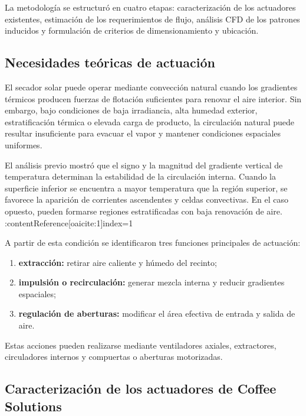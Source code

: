 La metodología se estructuró en cuatro etapas: caracterización de los actuadores existentes, estimación de los requerimientos de flujo, análisis CFD de los patrones inducidos y formulación de criterios de dimensionamiento y ubicación.

\subsection{Necesidades teóricas de actuación}
\label{subsec:necesidades_teoricas_actuacion}

El secador solar puede operar mediante convección natural cuando los gradientes térmicos producen fuerzas de flotación suficientes para renovar el aire interior. Sin embargo, bajo condiciones de baja irradiancia, alta humedad exterior, estratificación térmica o elevada carga de producto, la circulación natural puede resultar insuficiente para evacuar el vapor y mantener condiciones espaciales uniformes.

El análisis previo mostró que el signo y la magnitud del gradiente vertical de temperatura determinan la estabilidad de la circulación interna. Cuando la superficie inferior se encuentra a mayor temperatura que la región superior, se favorece la aparición de corrientes ascendentes y celdas convectivas. En el caso opuesto, pueden formarse regiones estratificadas con baja renovación de aire. :contentReference[oaicite:1]{index=1}

A partir de esta condición se identificaron tres funciones principales de actuación:

\begin{enumerate}
    \item \textbf{extracción:} retirar aire caliente y húmedo del recinto;
    \item \textbf{impulsión o recirculación:} generar mezcla interna y reducir gradientes espaciales;
    \item \textbf{regulación de aberturas:} modificar el área efectiva de entrada y salida de aire.
\end{enumerate}

Estas acciones pueden realizarse mediante ventiladores axiales, extractores, circuladores internos y compuertas o aberturas motorizadas.

\subsection{Caracterización de los actuadores de Coffee Solutions}
\label{subsec:caracterizacion_actuadores_coffee}

